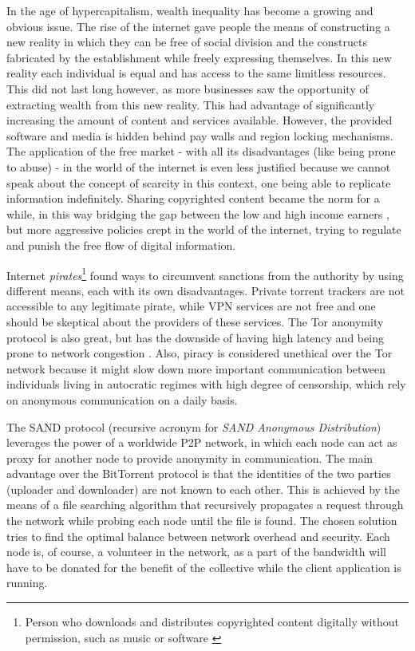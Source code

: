 In the age of hypercapitalism, wealth inequality has become a growing and 
obvious issue. The rise of the internet gave people the means of constructing a 
new reality in which they can be free of social division and the constructs 
fabricated by the establishment while freely expressing themselves. In this new 
reality each individual is equal and has access to the same limitless 
resources. This did not last long however, as more businesses saw the 
opportunity of extracting wealth from this new reality. This had advantage of 
significantly increasing the amount of content and services available. However, 
the provided software and media is hidden behind pay walls and region locking 
mechanisms. The application of the free market - with all its disadvantages 
(like being prone to abuse) - in the world of the internet is even less 
justified because we cannot speak about the concept of scarcity in this 
context, one being able to replicate information indefinitely. Sharing 
copyrighted content became the norm for a while, in this way bridging the gap 
between the low and high income earners \cite{piracyinequality}, but more 
aggressive policies crept in the world of the internet, trying to regulate and 
punish the free flow of digital information.

Internet \textit{pirates}\footnote{Person who downloads and distributes 
copyrighted content digitally without permission, such as music or software 
\cite{CHOI2007168}} found ways to circumvent sanctions from the authority by 
using different means, each with its own disadvantages. Private torrent 
trackers are not accessible to any legitimate pirate, while VPN services are 
not free and one should be skeptical about the providers of these services. The 
Tor anonymity protocol is also great, but has the downside of having high 
latency and being prone to network congestion \cite{torcongestion}. Also, 
piracy is considered unethical over the Tor network because it might slow down 
more important communication between individuals living in autocratic regimes 
with high degree of censorship, which rely on anonymous communication on a 
daily basis.

The SAND protocol (recursive acronym for \textit{SAND Anonymous Distribution}) 
leverages the power of a worldwide P2P network, in which each node can act as 
proxy for another node to provide anonymity in communication. The main 
advantage over the BitTorrent protocol is that the identities of the two 
parties (uploader and downloader) are not known to each other. This is achieved 
by the means of a file searching algorithm that recursively propagates a 
request through the network while probing each node until the file is found. 
The chosen solution tries to find the optimal balance between network overhead 
and security. Each node is, of course, a volunteer in the network, as a part of 
the bandwidth will have to be donated for the benefit of the collective while 
the client application is running.
